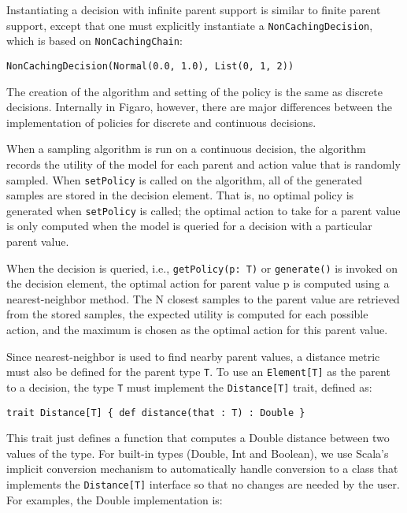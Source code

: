 Instantiating a decision with infinite parent support is similar to finite parent support, except that one must explicitly instantiate a \texttt{NonCachingDecision}, which is based on \texttt{NonCachingChain}:

\begin{flushleft}
\texttt{NonCachingDecision(Normal(0.0, 1.0), List(0, 1, 2))}
\end{flushleft}

The creation of the algorithm and setting of the policy is the same as discrete decisions. Internally in Figaro, however, there are major differences between the implementation of policies for discrete and continuous decisions.

When a sampling algorithm is run on a continuous decision, the algorithm records the utility of the model for each parent and action value that is randomly sampled. When \texttt{setPolicy} is called on the algorithm, all of the generated samples are stored in the decision element. That is, no optimal policy is generated when \texttt{setPolicy} is called; the optimal action to take for a parent value is only computed when the model is queried for a decision with a particular parent value.

When the decision is queried, i.e., \texttt{getPolicy(p: T)} or \texttt{generate()} is invoked on the decision element, the optimal action for parent value p is computed using a nearest-neighbor method. The N closest samples to the parent value are retrieved from the stored samples, the expected utility is computed for each possible action, and the maximum is chosen as the optimal action for this parent value.

Since nearest-neighbor is used to find nearby parent values, a distance metric must also be defined for the parent type \texttt{T}. To use an \texttt{Element[T]} as the parent to a decision, the type \texttt{T} must implement the \texttt{Distance[T]} trait, defined as:

\begin{flushleft}
\texttt{trait Distance[T] \{
\newline \tab def distance(that : T) : Double
\newline \} }
\end{flushleft}

This trait just defines a function that computes a Double distance between two values of the type. For built-in types (Double, Int and Boolean), we use Scala's implicit conversion mechanism to automatically handle conversion to a class that implements the \texttt{Distance[T]} interface so that no changes are needed by the user. For examples, the Double implementation is:

